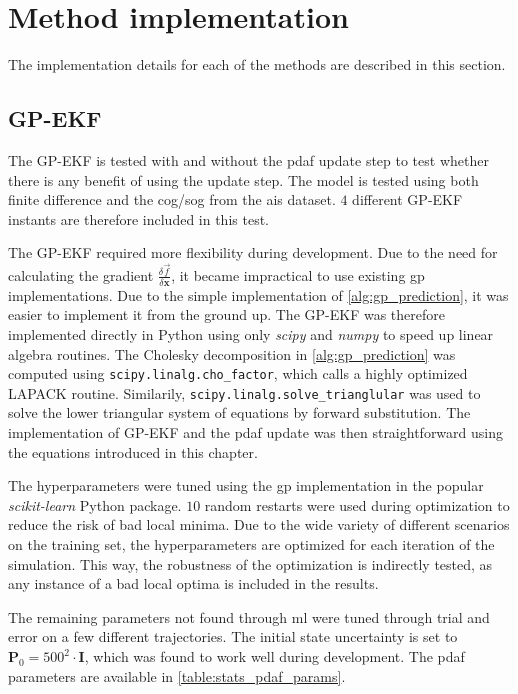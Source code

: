 \section{Method implementation}
The implementation details for each of the methods are described in this section.

\subsection{GP-EKF}
The GP-EKF is tested with and without the \acrshort{pdaf} update step to test whether there is any benefit of using the update step. The model is tested using both finite difference and the \acrshort{cog}/\acrshort{sog} from the \acrshort{ais} dataset. $4$ different GP-EKF instants are therefore included in this test.

The GP-EKF required more flexibility during development. Due to the need for calculating the gradient $\frac{\delta \vec{f}}{\delta \boldsymbol{x}}$, it became impractical to use existing \acrshort{gp} implementations. Due to the simple implementation of \cref{alg:gp_prediction}, it was easier to implement it from the ground up.
The GP-EKF was therefore implemented directly in Python using only \textit{scipy}\cite{scipy} and \textit{numpy}\cite{numpy} to speed up linear algebra routines. The Cholesky decomposition in \cref{alg:gp_prediction} was computed using \texttt{scipy.linalg.cho\_factor}, which calls a highly optimized LAPACK routine. Similarily, \texttt{scipy.linalg.solve\_\-trianglular} was used to solve the lower triangular system of equations by forward substitution. The implementation of GP-EKF and the \acrshort{pdaf} update was then straightforward using the equations introduced in this chapter.

The hyperparameters were tuned using the \acrshort{gp} implementation in the popular \textit{scikit-learn} \cite{scikit-learn} Python package. $10$ random restarts were used during optimization to reduce the risk of bad local minima. Due to the wide variety of different scenarios on the training set, the hyperparameters are optimized for each iteration of the simulation. This way, the robustness of the optimization is indirectly tested, as any instance of a bad local optima is included in the results.

The remaining parameters not found through \acrshort{ml} were tuned through trial and error on a few different trajectories.
The initial state uncertainty is set to $\boldsymbol{P}_0 = 500^2 \cdot \boldsymbol{I}$, which was found to work well during development. The \acrshort{pdaf} parameters are available in \cref{table:stats_pdaf_params}.

